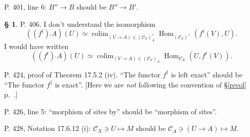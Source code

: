 \documentclass[12pt]{article}
\theoremstyle{remark}
\theoremstyle{definition}
\newtheorem{s}[thm]{\S}
\newcommand{\C}{\mathcal C}
\DeclareMathOperator*{\co}{colim}
\DeclareMathOperator{\Hom}{Hom}%
\begin{document}
\noindent P. 401, line 6: $B''\to B$ should be $B''\to B'$.
%
\begin{s}\label{c406}
P. 406. I don't understand the isomorphism 
$$
\left((f^t)\ \widehat{}A\right)(U)\simeq\co_{(V\to A)\in(\C_Y)_A^\wedge}\Hom_{(\C_Y)^\wedge}(f^t(V),U).
$$ 
I would have written 
$$
\left((f^t)\ \widehat{}A\right)(U)\simeq\co_{(V\to A)\in(\C_Y)_A}\Hom_{\C_X}(U,f^t(V)).
$$
\end{s}
%
\noindent P. 424, proof of Theorem 17.5.2 (iv). ``The functor $f^\dagger$ is left exact'' should be ``The functor $f^\dagger$ is exact''. [Here we are {\em not} following the convention of \S\ref{revol} p.~\pageref{revol}.]

\noindent P. 426, line 5: ``morphism of sites by'' should be ``morphism of sites''.

\noindent P. 428, Notation 17.6.12 (i): $\C_X\ni U\mapsto M$ should be $\C_A\ni(U\to A)\mapsto M$.
%
\end{document}

